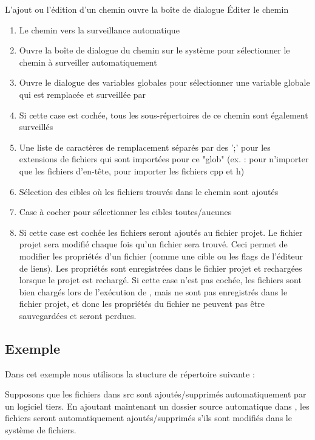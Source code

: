 L'ajout ou l'édition d'un chemin ouvre la boîte de dialogue Éditer le chemin


\begin{enumerate}[noitemsep]
\item Le chemin vers la surveillance automatique
\item Ouvre la boîte de dialogue du chemin sur le système pour sélectionner le chemin à surveiller automatiquement
\item Ouvre le dialogue des variables globales pour sélectionner une variable globale qui est remplacée et surveillée par \codeblocks
\item Si cette case est cochée, tous les sous-répertoires de ce chemin sont également surveillés
\item Une liste de caractères de remplacement séparés par des ';' pour les extensions de fichiers qui sont importées pour ce "glob" (ex. :  pour n'importer que les fichiers d'en-tête,  pour importer les fichiers cpp et h)
\item Sélection des cibles où les fichiers trouvés dans le chemin sont ajoutés
\item Case à cocher pour sélectionner les cibles toutes/aucunes
\item Si cette case est cochée les fichiers seront ajoutés au fichier projet. 
    Le fichier projet sera modifié chaque fois qu'un fichier sera trouvé. Ceci
    permet de modifier les propriétés d'un fichier (comme une cible ou les flags de l'éditeur de liens).
    Les propriétés sont enregistrées dans le fichier projet et rechargées lorsque le
    projet est rechargé. Si cette case n'est pas cochée, les fichiers sont bien chargés
    lors de l'exécution de \codeblocks, mais ne sont pas enregistrés dans le fichier projet, et donc
    les propriétés du fichier ne peuvent pas être sauvegardées et seront perdues.
\end{enumerate}

\subsection{Exemple}
Dans cet exemple nous utilisons la stucture de répertoire suivante :

Supposons que les fichiers dans src sont ajoutés/supprimés automatiquement par un logiciel tiers. En ajoutant maintenant un dossier source automatique dans \codeblocks, les fichiers seront automatiquement ajoutés/supprimés s'ils sont modifiés dans le système de fichiers.


